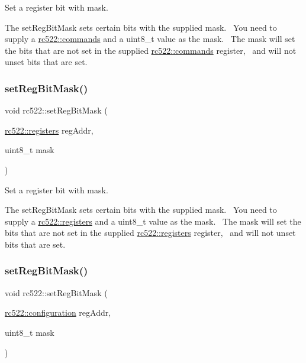 Set a register bit with mask. 

The set\+Reg\+Bit\+Mask sets certain bits with the supplied mask.~\newline
You need to supply a \hyperlink{classrc522_a6df2359c88d6c2f47faf58bc9e09eaa4}{rc522\+::commands} and a uint8\+\_\+t value as the mask.~\newline
The mask will set the bits that are not set in the supplied \hyperlink{classrc522_a6df2359c88d6c2f47faf58bc9e09eaa4}{rc522\+::commands} register,~\newline
and will not unset bits that are set. \mbox{\label{classrc522_acadff61e3733655710ea945c03137a39}} 
\subsubsection{\texorpdfstring{set\+Reg\+Bit\+Mask()}{setRegBitMask()}\hspace{0.1cm}{\footnotesize\ttfamily [2/4]}}
{\footnotesize\ttfamily void rc522\+::set\+Reg\+Bit\+Mask (\begin{DoxyParamCaption}\item[{\hyperlink{classrc522_a83057db5f8fefa3dc9a6e8e5f0e191ee}{rc522\+::registers}}]{reg\+Addr,  }\item[{uint8\+\_\+t}]{mask }\end{DoxyParamCaption})}



Set a register bit with mask. 

The set\+Reg\+Bit\+Mask sets certain bits with the supplied mask.~\newline
You need to supply a \hyperlink{classrc522_a83057db5f8fefa3dc9a6e8e5f0e191ee}{rc522\+::registers} and a uint8\+\_\+t value as the mask.~\newline
The mask will set the bits that are not set in the supplied \hyperlink{classrc522_a83057db5f8fefa3dc9a6e8e5f0e191ee}{rc522\+::registers} register,~\newline
and will not unset bits that are set. \mbox{\label{classrc522_aae350dcb495ec47cbb081b2fd9df35ff}} 
\subsubsection{\texorpdfstring{set\+Reg\+Bit\+Mask()}{setRegBitMask()}\hspace{0.1cm}{\footnotesize\ttfamily [3/4]}}
{\footnotesize\ttfamily void rc522\+::set\+Reg\+Bit\+Mask (\begin{DoxyParamCaption}\item[{\hyperlink{classrc522_afcf27c8198d017cd4e8173c7d7a6fded}{rc522\+::configuration}}]{reg\+Addr,  }\item[{uint8\+\_\+t}]{mask }\end{DoxyParamCaption})}




